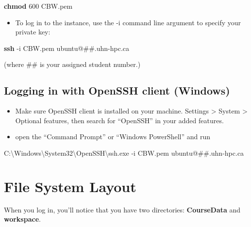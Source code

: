\documentclass[
]{book}
\newenvironment{Shaded}{\begin{snugshade}}{\end{snugshade}}
\newcommand{\AttributeTok}[1]{\textcolor[rgb]{0.13,0.29,0.53}{#1}}
\newcommand{\ExtensionTok}[1]{#1}
\newcommand{\FunctionTok}[1]{\textcolor[rgb]{0.13,0.29,0.53}{\textbf{#1}}}
\newcommand{\NormalTok}[1]{#1}
\providecommand{\tightlist}{%
  \setlength{\itemsep}{0pt}\setlength{\parskip}{0pt}}
\begin{document}
\begin{Shaded}
\begin{Highlighting}[]
 \FunctionTok{chmod}\NormalTok{ 600 CBW.pem}
\end{Highlighting}
\end{Shaded}

\begin{itemize}
\tightlist
\item
  To log in to the instance, use the -i command line argument to specify your private key:
\end{itemize}

\begin{Shaded}
\begin{Highlighting}[]
 \FunctionTok{ssh} \AttributeTok{{-}i}\NormalTok{ CBW.pem ubuntu@\#\#.uhn{-}hpc.ca}
\end{Highlighting}
\end{Shaded}

(where \#\# is your assigned student number.)

\subsection{Logging in with OpenSSH client (Windows)}\label{logging-in-with-openssh-client-windows}

\begin{itemize}
\item
  Make sure OpenSSH client is installed on your machine. Settings \textgreater{} System \textgreater{} Optional features, then search for ``OpenSSH'' in your added features.
\item
  open the ``Command Prompt'' or ``Windows PowerShell'' and run
\end{itemize}

\begin{Shaded}
\begin{Highlighting}[]
 \ExtensionTok{C:\textbackslash{}Windows\textbackslash{}System32\textbackslash{}OpenSSH\textbackslash{}ssh.exe} \AttributeTok{{-}i}\NormalTok{ CBW.pem ubuntu@\#\#.uhn{-}hpc.ca}
\end{Highlighting}
\end{Shaded}

\section{File System Layout}\label{file-system-layout}

When you log in, you'll notice that you have two directories: \textbf{CourseData} and \textbf{workspace}.
\end{document}
